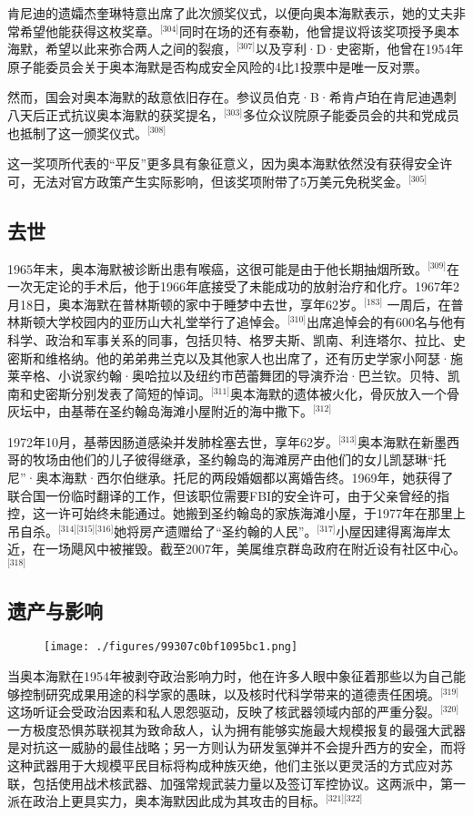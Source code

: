肯尼迪的遗孀杰奎琳特意出席了此次颁奖仪式，以便向奥本海默表示，她的丈夫非常希望他能获得这枚奖章。\(^\text{[304]}\)同时在场的还有泰勒，他曾提议将该奖项授予奥本海默，希望以此来弥合两人之间的裂痕，\(^\text{[307]}\)以及亨利·D·史密斯，他曾在1954年原子能委员会关于奥本海默是否构成安全风险的4比1投票中是唯一反对票。

然而，国会对奥本海默的敌意依旧存在。参议员伯克·B·希肯卢珀在肯尼迪遇刺八天后正式抗议奥本海默的获奖提名，\(^\text{[303]}\)多位众议院原子能委员会的共和党成员也抵制了这一颁奖仪式。\(^\text{[308]}\)

这一奖项所代表的“平反”更多具有象征意义，因为奥本海默依然没有获得安全许可，无法对官方政策产生实际影响，但该奖项附带了5万美元免税奖金。\(^\text{[305]}\)
\subsection{去世}
1965年末，奥本海默被诊断出患有喉癌，这很可能是由于他长期抽烟所致。\(^\text{[309]}\)在一次无定论的手术后，他于1966年底接受了未能成功的放射治疗和化疗。1967年2月18日，奥本海默在普林斯顿的家中于睡梦中去世，享年62岁。\(^\text{[183]}\) 一周后，在普林斯顿大学校园内的亚历山大礼堂举行了追悼会。\(^\text{[310]}\)出席追悼会的有600名与他有科学、政治和军事关系的同事，包括贝特、格罗夫斯、凯南、利连塔尔、拉比、史密斯和维格纳。他的弟弟弗兰克以及其他家人也出席了，还有历史学家小阿瑟·施莱辛格、小说家约翰·奥哈拉以及纽约市芭蕾舞团的导演乔治·巴兰钦。贝特、凯南和史密斯分别发表了简短的悼词。\(^\text{[311]}\)奥本海默的遗体被火化，骨灰放入一个骨灰坛中，由基蒂在圣约翰岛海滩小屋附近的海中撒下。\(^\text{[312]}\)

1972年10月，基蒂因肠道感染并发肺栓塞去世，享年62岁。\(^\text{[313]}\)奥本海默在新墨西哥的牧场由他们的儿子彼得继承，圣约翰岛的海滩房产由他们的女儿凯瑟琳“托尼”·奥本海默·西尔伯继承。托尼的两段婚姻都以离婚告终。1969年，她获得了联合国一份临时翻译的工作，但该职位需要FBI的安全许可，由于父亲曾经的指控，这一许可始终未能通过。她搬到圣约翰岛的家族海滩小屋，于1977年在那里上吊自杀。\(^\text{[314][315][316]}\)她将房产遗赠给了“圣约翰的人民”。\(^\text{[317]}\)小屋因建得离海岸太近，在一场飓风中被摧毁。截至2007年，美属维京群岛政府在附近设有社区中心。\(^\text{[318]}\)
\subsection{遗产与影响}
\begin{figure}[ht]
\centering
\texttt{[image: ./figures/99307c0bf1095bc1.png]}
\caption{} \label{fig_ABHM_15}
\end{figure}
当奥本海默在1954年被剥夺政治影响力时，他在许多人眼中象征着那些以为自己能够控制研究成果用途的科学家的愚昧，以及核时代科学带来的道德责任困境。\(^\text{[319]}\)这场听证会受政治因素和私人恩怨驱动，反映了核武器领域内部的严重分裂。\(^\text{[320]}\)一方极度恐惧苏联视其为致命敌人，认为拥有能够实施最大规模报复的最强大武器是对抗这一威胁的最佳战略；另一方则认为研发氢弹并不会提升西方的安全，而将这种武器用于大规模平民目标将构成种族灭绝，他们主张以更灵活的方式应对苏联，包括使用战术核武器、加强常规武装力量以及签订军控协议。这两派中，第一派在政治上更具实力，奥本海默因此成为其攻击的目标。\(^\text{[321][322]}\)

